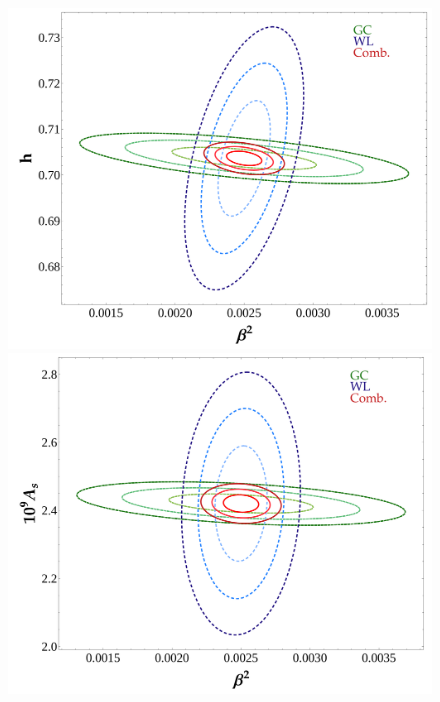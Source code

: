 \begin{figure}
\begin{centering}
\includegraphics[height=0.15\paperheight]{Chapters/fitting-funcs/figures/GC-WL-Comb-kNyHalf-margedCont-Grid1}
\hfill{}\includegraphics[height=0.15\paperheight]{Chapters/fitting-funcs/figures/GC-WL-Comb-kNyHalf-margedCont-Grid2}\hfill{}

\end{centering}
\end{figure}
